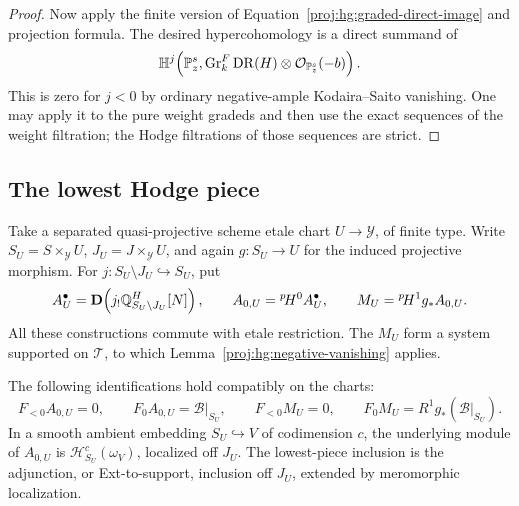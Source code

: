 \begin{proof}
Now apply the finite version of
Equation~\eqref{proj:hg:graded-direct-image} and projection formula.
The desired hypercohomology is a direct summand of
\[
 \mathbb H^j\!\left(
   \mathbb{P}^s_z,\operatorname{Gr}^F_k\operatorname{DR}(H)\otimes\mathcal{O}_{\mathbb{P}^s_z}(-b)
 \right).
\]
This is zero for \(j<0\) by ordinary negative-ample
Kodaira--Saito vanishing.  One may apply it to the pure weight
gradeds and then use the exact sequences of the weight filtration;
the Hodge filtrations of those sequences are strict.
\end{proof}

\subsection{The lowest Hodge piece}

Take a separated quasi-projective scheme etale chart
\(U\to\mathcal Y\), of finite type.  Write
\(S_U=S\times_{\mathcal Y}U\), \(J_U=J\times_{\mathcal Y}U\),
and again \(g:S_U\to U\) for the induced projective morphism.
For \(j:S_U\setminus J_U\hookrightarrow S_U\), put
\[
 A^\bullet_U=\mathbf D\!\left(
             j_!\mathbb{Q}^H_{S_U\setminus J_U}[N]\right),
 \qquad
 A_{0,U}={}^{p}\!H^0A^\bullet_U,
 \qquad
 M_U={}^{p}\!H^1g_*A_{0,U}.
\]
All these constructions commute with etale restriction.  The \(M_U\)
form a system supported on \(\mathcal T\), to which
Lemma~\ref{proj:hg:negative-vanishing} applies.

\begin{lemma}\label{proj:hg:lowest-piece}
The following identifications hold compatibly on the charts:
\[
 F_{<0}A_{0,U}=0,\qquad F_0A_{0,U}=\mathcal B|_{S_U},
 \qquad
 F_{<0}M_U=0,\qquad
 F_0M_U=R^1g_*(\mathcal B|_{S_U}).
\]
In a smooth ambient embedding \(S_U\hookrightarrow V\) of
codimension \(c\), the underlying module of \(A_{0,U}\) is
\(\mathcal H^c_{S_U}(\omega_V)\), localized off \(J_U\).
The lowest-piece inclusion is the adjunction, or Ext-to-support,
inclusion off \(J_U\), extended by meromorphic localization.
\end{lemma}

